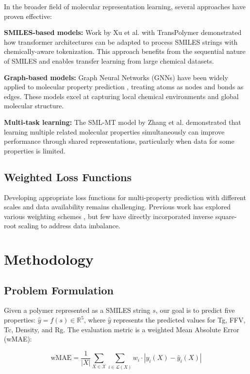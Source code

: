 \documentclass[10pt,twocolumn,letterpaper]{article}
\begin{document}
In the broader field of molecular representation learning, several approaches have proven effective:

\textbf{SMILES-based models:} Work by Xu et al. \cite{xu2020} with TransPolymer demonstrated how transformer architectures can be adapted to process SMILES strings with chemically-aware tokenization. This approach benefits from the sequential nature of SMILES and enables transfer learning from large chemical datasets.

\textbf{Graph-based models:} Graph Neural Networks (GNNs) have been widely applied to molecular property prediction \cite{xiong2019}, treating atoms as nodes and bonds as edges. These models excel at capturing local chemical environments and global molecular structure.

\textbf{Multi-task learning:} The SML-MT model by Zhang et al. \cite{zhang2021} demonstrated that learning multiple related molecular properties simultaneously can improve performance through shared representations, particularly when data for some properties is limited.

\subsection{Weighted Loss Functions}

Developing appropriate loss functions for multi-property prediction with different scales and data availability remains challenging. Previous work has explored various weighting schemes \cite{wang2020}, but few have directly incorporated inverse square-root scaling to address data imbalance.

\section{Methodology}

\subsection{Problem Formulation}

Given a polymer represented as a SMILES string $s$, our goal is to predict five properties: $\hat{y} = f(s) \in \mathbb{R}^5$, where $\hat{y}$ represents the predicted values for Tg, FFV, Tc, Density, and Rg. The evaluation metric is a weighted Mean Absolute Error (wMAE):

\begin{equation}
\text{wMAE} = \frac{1}{|X|} \sum_{X \in \mathcal{X}} \sum_{i \in \mathcal{L}(X)} w_i \cdot |y_i(X) - \hat{y}_i(X)|
\end{equation}
\end{document}
